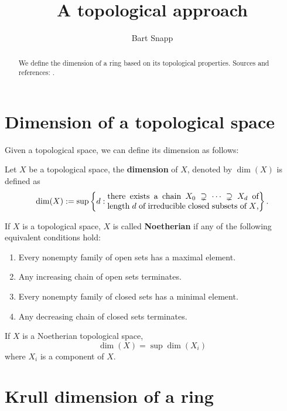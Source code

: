 \documentclass{ximera}
\author{Bart Snapp}
\title{A topological approach}
\begin{document}
\begin{abstract}
  We define the dimension of a ring based on its topological
  properties.  Sources and references: \cite{sD2008}.
\end{abstract}
\maketitle

\section{Dimension of a topological space}

Given a topological space, we can define its dimension as follows:


\begin{definition}
  Let $X$ be a topological space, the \textbf{dimension} of $X$,
  denoted by $\dim(X)$ is defined as
  \[
  \dim(X) :=\sup\left\{d:
  \begin{minipage}{43ex}
    there exists a chain $X_0\supsetneq \dots \supsetneq X_d$ of
    length $d$ of irreducible closed subsets of $X$,
  \end{minipage}
  \right\}.
  \]
\end{definition}


\begin{definition}
  If $X$ is a topological space, $X$ is called \textbf{Noetherian} if
  any of the following equivalent conditions hold:
  \begin{enumerate}
  \item Every nonempty family of open sets has a maximal element.
  \item Any increasing chain of open sets terminates.
  \item Every nonempty family of closed sets has a minimal element.
  \item Any decreasing chain of closed sets terminates.
  \end{enumerate}
\end{definition}



\begin{proposition}
  If $X$ is a Noetherian topological space,
  \[
  \dim(X) = \sup\dim(X_i)
  \]
  where $X_i$ is a component of $X$. 
\end{proposition}

\section{Krull dimension of a ring}
\end{document}

